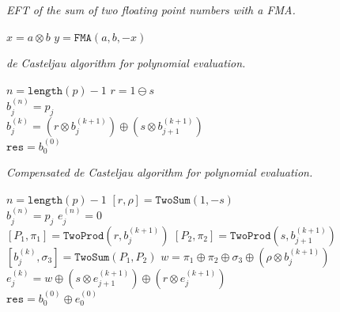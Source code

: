 \documentclass[letterpaper,10pt]{article}
\begin{document}
\begin{algorithm}[H]
  \caption{\textit{EFT of the sum of two floating point numbers with a FMA.}}

  \begin{algorithmic}
      \State \(x = a \otimes b\)
      \State \(y = \mathtt{FMA}(a, b, -x)\)
    \EndFunction
  \end{algorithmic}
\end{algorithm}

\begin{algorithm}[H]
  \caption{\textit{de Casteljau algorithm for polynomial evaluation.}}

  \begin{algorithmic}
      \State \(n = \texttt{length}(p) - 1\)
      \State \(r = 1 \ominus s\)
      \\
        \State \(b_j^{(n)} = p_j\)
      \EndFor
      \\
          \State \(b_j^{(k)} = \left(r \otimes b_j^{(k + 1)}\right) \oplus
              \left(s \otimes b_{j + 1}^{(k + 1)}\right)\)
        \EndFor
      \EndFor
      \\
      \State \(\mathtt{res} = b_0^{(0)}\)
    \EndFunction
  \end{algorithmic}
\end{algorithm}

\begin{algorithm}[H]
  \caption{\textit{Compensated de Casteljau algorithm for polynomial evaluation.}}

  \begin{algorithmic}
      \State \(n = \texttt{length}(p) - 1\)
      \State \(\left[r, \rho\right] = \mathtt{TwoSum}(1, -s)\)
      \\
        \State \(b_j^{(n)} = p_j\)
        \State \(e_j^{(n)} = 0\)
      \EndFor
      \\
          \State \(\left[P_1, \pi_1\right] = \mathtt{TwoProd}\left(
              r, b_j^{(k + 1)}\right)\)
          \State \(\left[P_2, \pi_2\right] = \mathtt{TwoProd}\left(
              s, b_{j + 1}^{(k + 1)}\right)\)
          \State \(\left[b_j^{(k)}, \sigma_3\right] = \mathtt{TwoSum}(
              P_1, P_2)\)
          \State \(w = \pi_1 \oplus \pi_2 \oplus \sigma_3 \oplus
              \left(\rho \otimes b_j^{(k + 1)}\right)\)
          \State \(e_j^{(k)} = w \oplus \left(s \otimes e_{j + 1}^{(k + 1)}
              \right) \oplus \left(r \otimes e_j^{(k + 1)}\right)\)
        \EndFor
      \EndFor
      \\
      \State \(\mathtt{res} = b_0^{(0)} \oplus e_0^{(0)}\)
    \EndFunction
  \end{algorithmic}
\end{algorithm}
\end{document}
